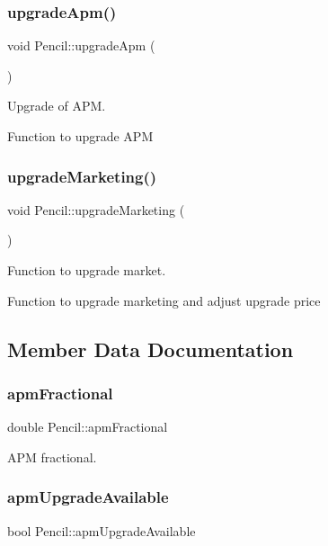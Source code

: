 \subsubsection{\texorpdfstring{upgrade\+Apm()}{upgradeApm()}}
{\footnotesize\ttfamily void Pencil\+::upgrade\+Apm (\begin{DoxyParamCaption}{ }\end{DoxyParamCaption})}

Upgrade of A\+PM.

Function to upgrade A\+PM \mbox{\label{classPencil_a4d1fff5599020013b3b52cf84d714847}} 
\subsubsection{\texorpdfstring{upgrade\+Marketing()}{upgradeMarketing()}}
{\footnotesize\ttfamily void Pencil\+::upgrade\+Marketing (\begin{DoxyParamCaption}{ }\end{DoxyParamCaption})}

Function to upgrade market.

Function to upgrade marketing and adjust upgrade price 

\subsection{Member Data Documentation}
\mbox{\label{classPencil_a71b50db432298677e50884b34002bbcf}} 
\subsubsection{\texorpdfstring{apm\+Fractional}{apmFractional}}
{\footnotesize\ttfamily double Pencil\+::apm\+Fractional}

A\+PM fractional. \mbox{\label{classPencil_a3d54aa5bf47e0f850640098fe1f64730}} 
\subsubsection{\texorpdfstring{apm\+Upgrade\+Available}{apmUpgradeAvailable}}
{\footnotesize\ttfamily bool Pencil\+::apm\+Upgrade\+Available}


